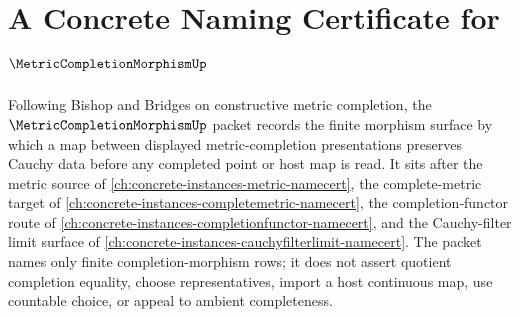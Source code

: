 \chapter{A Concrete Naming Certificate for $\MetricCompletionMorphismUp$}
\label{ch:concrete-instances-metric-completion-morphism-namecert}

Following Bishop and Bridges on constructive metric completion, the $\MetricCompletionMorphismUp$ packet records the finite morphism surface by which a map between displayed metric-completion presentations preserves Cauchy data before any completed point or host map is read. It sits after the metric source of \autoref{ch:concrete-instances-metric-namecert}, the complete-metric target of \autoref{ch:concrete-instances-completemetric-namecert}, the completion-functor route of \autoref{ch:concrete-instances-completionfunctor-namecert}, and the Cauchy-filter limit surface of \autoref{ch:concrete-instances-cauchyfilterlimit-namecert}. The packet names only finite completion-morphism rows; it does not assert quotient completion equality, choose representatives, import a host continuous map, use countable choice, or appeal to ambient completeness.

